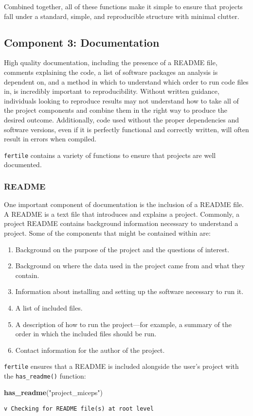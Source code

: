 \documentclass[12pt,twoside]{reedthesis}
\newenvironment{Shaded}{\begin{snugshade}}{\end{snugshade}}
\newcommand{\KeywordTok}[1]{\textcolor[rgb]{0.13,0.29,0.53}{\textbf{#1}}}
\newcommand{\StringTok}[1]{\textcolor[rgb]{0.31,0.60,0.02}{#1}}
\newcommand{\NormalTok}[1]{#1}
\providecommand{\tightlist}{%
  \setlength{\itemsep}{0pt}\setlength{\parskip}{0pt}}
\begin{document}
Combined together, all of these functions make it simple to ensure that
projects fall under a standard, simple, and reproducible structure with
minimal clutter.

\subsection{Component 3: Documentation}\label{component-3-documentation}

High quality documentation, including the presence of a README file,
comments explaining the code, a list of software packages an analysis is
dependent on, and a method in which to understand which order to run
code files in, is incredibly important to reproducibility. Without
written guidance, individuals looking to reproduce results may not
understand how to take all of the project components and combine them in
the right way to produce the desired outcome. Additionally, code used
without the proper dependencies and software versions, even if it is
perfectly functional and correctly written, will often result in errors
when compiled.

\texttt{fertile} contains a variety of functions to ensure that projects
are well documented.

\subsubsection{README}\label{readme}

One important component of documentation is the inclusion of a README
file. A README is a text file that introduces and explains a project.
Commonly, a project README contains background information necessary to
understand a project. Some of the components that might be contained
within are:
\begin{enumerate}
\def\labelenumi{\arabic{enumi}.}
\tightlist
\item
  Background on the purpose of the project and the questions of
  interest.
\item
  Background on where the data used in the project came from and what
  they contain.
\item
  Information about installing and setting up the software necessary to
  run it.
\item
  A list of included files.
\item
  A description of how to run the project---for example, a summary of
  the order in which the included files should be run.
\item
  Contact information for the author of the project.
\end{enumerate}
\texttt{fertile} ensures that a README is included alongside the user's
project with the \texttt{has\_readme()} function:
\begin{Shaded}
\begin{Highlighting}[]
\KeywordTok{has_readme}\NormalTok{(}\StringTok{"project_miceps"}\NormalTok{)}
\end{Highlighting}
\end{Shaded}
\begin{verbatim}
v Checking for README file(s) at root level
\end{verbatim}
\end{document}
